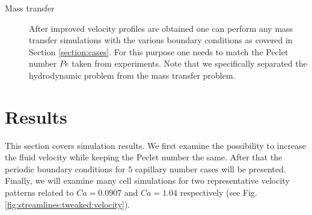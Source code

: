 \documentclass{article}
\newcommand{\ububble}{U_{\mathrm{bubble}}}
\begin{document}
\begin{description}
\item[Mass transfer] After improved velocity profiles are obtained one can perform any mass
transfer simulations with the various boundary conditions as covered in Section \ref{section:cases}.
For this purpose one needs to match the Peclet number $Pe$ taken from experiments. Note that we
specifically separated the hydrodynamic problem from the mass transfer problem. 
\end{description}

\section{Results}
This section covers simulation results. We first examine the possibility to increase the fluid
velocity while keeping the Peclet number the same. After that  the periodic boundary
conditions for $5$ capillary number cases will be presented. Finally, we will examine
many
cell simulations for two representative velocity patterns related to $Ca=0.0907$ and $Ca=1.04$ respectively 
(see Fig. \ref{fig:streamlines:tweaked:velocity}). 
\end{document}
